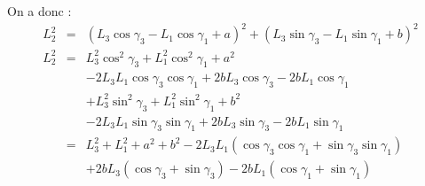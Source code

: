 \documentclass[10pt,fleqn]{article} %
\begin{document}
\begin{multicols}{2}
\begin{multicols}{2}
\begin{corrige}
On a donc : 
\begin{eqnarray*}
L_2^2 &=& \left( L_3\cos\gamma_{3}- L_1 \cos\gamma_{1} + a  \right)^2
+ \left( L_3 \sin\gamma_{3}-L_1 \sin\gamma_{1} + b\right)^2 \\
L_2^2 &=& 
L_3^2\cos^2\gamma_{3}+ L_1^2 \cos^2\gamma_{1} + a^2 \\
&&-2  L_3 L_1\cos\gamma_{3} \cos\gamma_{1}
+2 b L_3 \cos\gamma_{3}
-2bL_1 \cos\gamma_{1}\\
&&+L_3^2 \sin^2\gamma_{3}+ L_1^2 \sin^2\gamma_{1} + b^2 \\
&&-2  L_3 L_1 \sin\gamma_{3} \sin\gamma_{1}
+2 b L_3 \sin\gamma_{3}
-2bL_1 \sin\gamma_{1}\\
& = & L_3^2+ L_1^2  + a^2+ b^2  
-2  L_3 L_1\left( \cos\gamma_{3} \cos\gamma_{1} + \sin\gamma_{3} \sin\gamma_{1} \right)\\
&& +2 b L_3 \left( \cos\gamma_{3} + \sin\gamma_{3}\right)
-2bL_1 \left( \cos\gamma_{1} + \sin\gamma_{1}\right)\\
\end{eqnarray*}
\end{corrige}
\else \fi





\ifprof
\end{multicols}
\else
\end{multicols}
\fi

\end{document}
